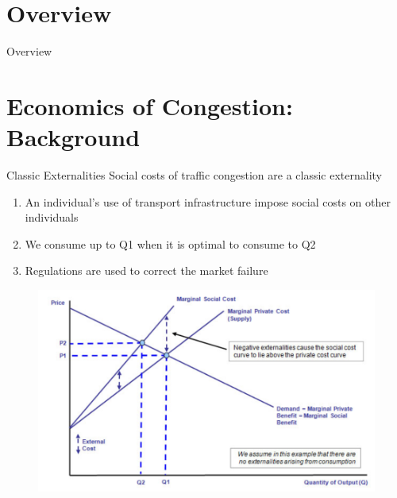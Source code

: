 \documentclass[newPxFont]{beamer}
\begin{document}
\section*{Overview}
\begin{frame}{Overview}
\tableofcontents[hideallsubsections]
\end{frame}


%
%

\section{Economics of Congestion: Background}

\begin{frame}[c]{Classic Externalities}
Social costs of traffic congestion are a classic externality
\begin{enumerate}  
	\item{An individual's use of transport infrastructure impose social costs on other individuals}
	\item{We consume up to Q1 when it is optimal to consume to Q2}  
	\item{Regulations are used to correct the market failure}
\end{enumerate}
\begin{figure}
	\centering
	\includegraphics[width=0.65\linewidth]{P_QGraph.png}
\end{figure}  
\end{frame}
\end{document}

